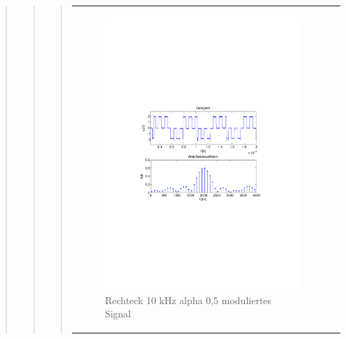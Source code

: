 \begin{quote}
\begin{quote}
\begin{quote}
\begin{center}
\begin{tabular}{ll}
            \hspace{-5cm}
                \begin{minipage}{0.6\textwidth}
                    \begin{figure}[H]
                        \includegraphics[scale=0.7, trim = 35mm 100mm 35mm 95mm, clip]{Bilder/shaperec10_05abget_zeit}
                          \caption{Rechteck 10 kHz alpha 0,5 moduliertes Signal}
		                  \label{fig:shaperec10_05zeit}
                    \end{figure}
                \end{minipage}
                

\end{tabular}
\end{center}
\end{quote}
\end{quote}
\end{quote}
